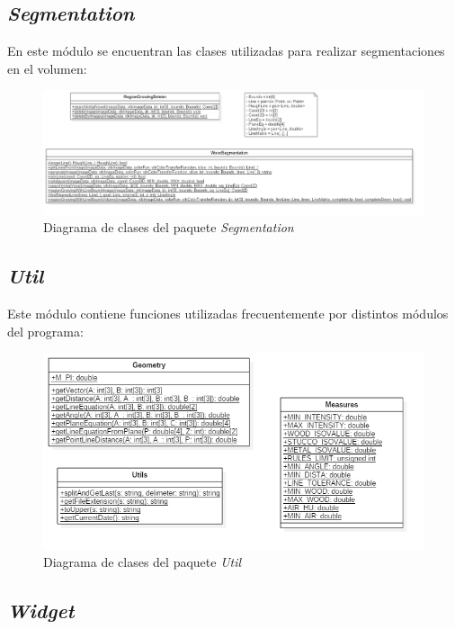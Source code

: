 \subsection{\textit{Segmentation}}

En este módulo se encuentran las clases utilizadas para realizar segmentaciones en el volumen:

\begin{figure}[H]
	\centering
	\includegraphics[width=12cm]{imagenes/diseno/segmentation}
	\caption{Diagrama de clases del paquete \textit{Segmentation}}
	\label{fig:diseno/segmentation}
\end{figure}

\subsection{\textit{Util}}

Este módulo contiene funciones utilizadas frecuentemente por distintos módulos del programa:

\begin{figure}[H]
	\centering
	\includegraphics[width=12cm]{imagenes/diseno/util}
	\caption{Diagrama de clases del paquete \textit{Util}}
	\label{fig:diseno/util}
\end{figure}

\subsection{\textit{Widget}}

